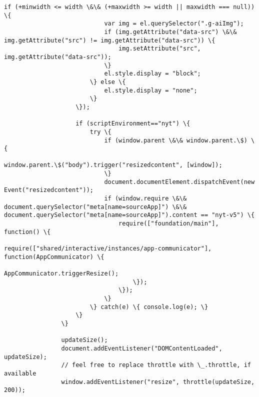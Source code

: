 \documentclass[11pt]{article}
\begin{document}
\begin{Verbatim}[commandchars=\\\{\}]
         				if (+minwidth <= width \&\& (+maxwidth >= width || maxwidth === null)) \{
         					var img = el.querySelector(".g-aiImg");
         					if (img.getAttribute("data-src") \&\& img.getAttribute("src") != img.getAttribute("data-src")) \{
         						img.setAttribute("src", img.getAttribute("data-src"));
         					\}
         					el.style.display = "block";
         				\} else \{
         					el.style.display = "none";
         				\}
         			\});
         
         			if (scriptEnvironment=="nyt") \{
         				try \{
         					if (window.parent \&\& window.parent.\$) \{
         						window.parent.\$("body").trigger("resizedcontent", [window]);
         					\}
         					document.documentElement.dispatchEvent(new Event("resizedcontent"));
         					if (window.require \&\& document.querySelector("meta[name=sourceApp]") \&\& document.querySelector("meta[name=sourceApp]").content == "nyt-v5") \{
         						require(["foundation/main"], function() \{
         							require(["shared/interactive/instances/app-communicator"], function(AppCommunicator) \{
         								AppCommunicator.triggerResize();
         							\});
         						\});
         					\}
         				\} catch(e) \{ console.log(e); \}
         			\}
         		\}
         
         		updateSize();
         		document.addEventListener("DOMContentLoaded", updateSize);
         		// feel free to replace throttle with \_.throttle, if available
         		window.addEventListener("resize", throttle(updateSize, 200));
         

\end{Verbatim}
\end{document}
